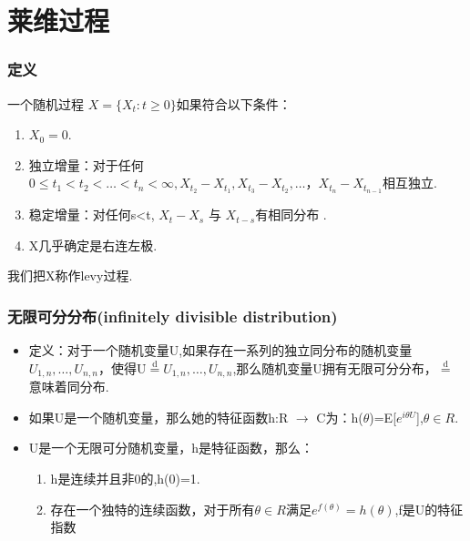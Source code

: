 \documentclass{beamer}
\begin{document}
	
	
	
\section{莱维过程}

\begin{frame}
\frametitle{定义}
一个随机过程 ${X=\{X_{t}:t\geq 0\}}$如果符合以下条件： 
\begin{enumerate}[(1)]
\item $X_{0}=0$.
\item 独立增量：对于任何$0\leq t_{1} < t_{2} < \dots < t_{n} < \infty ,X_{t_2}-X_{t_1},X_{t_3}-X_{t_2},\dots，X_{t_n}-X_{t_{n-1}}$相互独立.
\item 稳定增量：对任何s<t, $X_{t}-X_{s}$ 与 $X_{t-s}$有相同分布 .  
\item X几乎确定是右连左极.
\end{enumerate}
我们把X称作levy过程.
\end{frame}

\begin{frame}
\frametitle{无限可分分布(infinitely divisible distribution)}
\begin{itemize}
\item 定义：对于一个随机变量U,如果存在一系列的独立同分布的随机变量$U_{1,n},\dots,U_{n,n}$，使得U$\overset{\text{d}}{=}U_{1,n},\dots,U_{n,n}$,那么随机变量U拥有无限可分分布，$\overset{\text{d}}{=}$意味着同分布.
\item 如果U是一个随机变量，那么她的特征函数h:R $\to$ C为：h($\theta$)=E[$e^{i\theta U}$],$\theta \in R$.
\item U是一个无限可分随机变量，h是特征函数，那么：
\begin{enumerate}[(1)]
\item h是连续并且非0的,h(0)=1.
\item 存在一个独特的连续函数，对于所有$\theta \in R$满足$e^{f(\theta)}=h(\theta)$,f是U的特征指数
\end{enumerate}
\end{itemize}
\end{frame}
\end{document}
